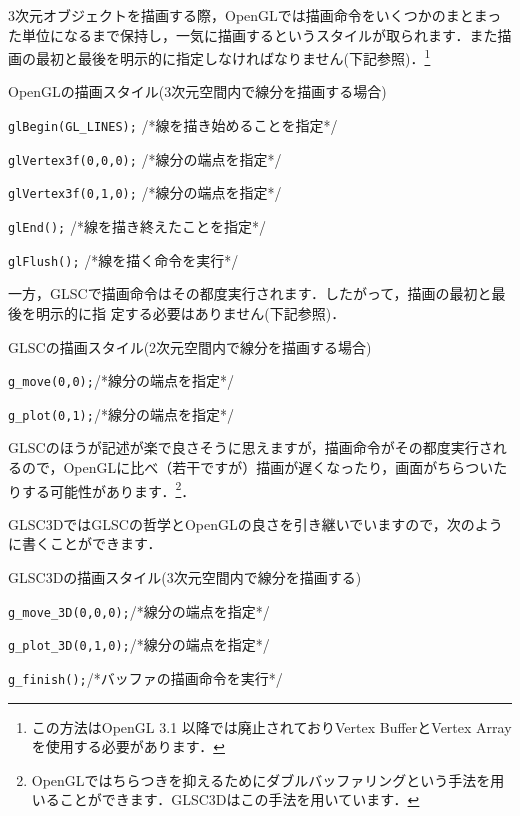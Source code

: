 \documentclass[a4paper,12pt]{jsarticle}%
\begin{document}
3次元オブジェクトを描画する際，OpenGLでは描画命令をいくつかのまとまった単位になるまで保持し，一気に描画するというスタイルが取られます．また描画の最初と最後を明示的に指定しなければなりません(下記参照)．\footnote{この方法はOpenGL 3.1 以降では廃止されておりVertex BufferとVertex Arrayを使用する必要があります．}

\begin{itembox}[l]{OpenGLの描画スタイル(3次元空間内で線分を描画する場合)}
	
	\verb|glBegin(GL_LINES);|	\hspace{20mm}/*線を描き始めることを指定*/
	
	\verb|glVertex3f(0,0,0);|		\hspace{20mm}/*線分の端点を指定*/
	
	\verb|glVertex3f(0,1,0);|		\hspace{20mm}/*線分の端点を指定*/
	
	\verb|glEnd();|				\hspace{38mm}/*線を描き終えたことを指定*/

	\verb|glFlush();|				\hspace{34mm}/*線を描く命令を実行*/
\end{itembox}

一方，GLSCで描画命令はその都度実行されます．したがって，描画の最初と最後を明示的に指
定する必要はありません(下記参照)．

\begin{itembox}[l]{GLSCの描画スタイル(2次元空間内で線分を描画する場合)}
	
	\verb|g_move(0,0);|\hspace{30mm}/*線分の端点を指定*/
	
	\verb|g_plot(0,1);|\hspace{30mm}/*線分の端点を指定*/

\end{itembox}

GLSCのほうが記述が楽で良さそうに思えますが，描画命令がその都度実行されるので，OpenGLに比べ（若干ですが）描画が遅くなったり，画面がちらついたりする可能性があります．\footnote{OpenGLではちらつきを抑えるためにダブルバッファリングという手法を用いることができます．GLSC3Dはこの手法を用いています．}．

GLSC3DではGLSCの哲学とOpenGLの良さを引き継いでいますので，次のように書くことができます．

\begin{itembox}[l]{GLSC3Dの描画スタイル(3次元空間内で線分を描画する)}
	
	\verb|g_move_3D(0,0,0);|\hspace{30mm}/*線分の端点を指定*/
	
	\verb|g_plot_3D(0,1,0);|\hspace{30mm}/*線分の端点を指定*/
	
	\verb|g_finish();|\hspace{35mm}/*バッファの描画命令を実行*/

\end{itembox}
  
\end{document}
